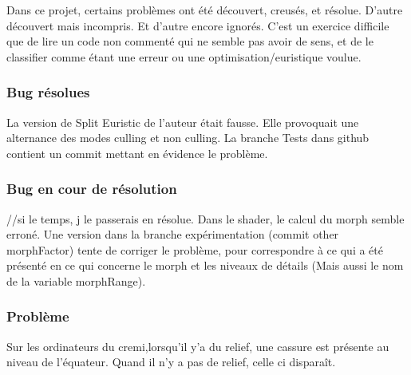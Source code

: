 Dans ce projet, certains problèmes ont été découvert, creusés, et résolue. D'autre découvert mais incompris. Et d'autre encore ignorés. C'est un exercice difficile que de lire un code non commenté qui ne semble pas avoir de sens, et de le classifier comme étant une erreur ou une optimisation/euristique voulue.
\subsubsection{Bug résolues}
La version de Split Euristic de l'auteur était fausse. Elle provoquait une alternance des modes culling et non culling. La branche Tests dans github contient un commit mettant en évidence le problème.

\subsubsection{Bug en cour de résolution}
//si le temps, j le passerais en résolue.
Dans le shader, le calcul du morph semble erroné. Une version dans la branche expérimentation (commit other morphFactor) tente de corriger le problème, pour correspondre à ce qui a été présenté en ce qui concerne le morph et les niveaux de détails (Mais aussi le nom de la variable morphRange). 
\subsubsection{Problème}
Sur les ordinateurs du cremi,lorsqu'il y'a du relief, une cassure est présente au niveau de l'équateur. Quand il n'y a pas de relief, celle ci disparaît.
 